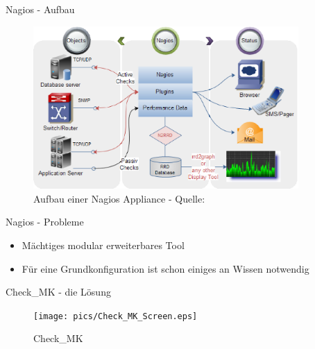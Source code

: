 \documentclass[12pt]{beamer}              %
\begin{document}
\begin{frame}{Nagios - Aufbau}
	\begin{figure}
		\centering
		\includegraphics[width=0.9\textwidth]{pics/NagiosMonitoring.eps}
		\caption[Grober Aufbau von Nagios]{Aufbau einer Nagios Appliance - Quelle: \textcite{nagiosaufbau}}
	\end{figure}
\end{frame}
\begin{frame}{Nagios - Probleme}
	\begin{itemize}
		\item Mächtiges modular erweiterbares Tool
		\item Für eine Grundkonfiguration ist schon einiges an Wissen notwendig
	\end{itemize}
\end{frame}
\begin{frame}{Check\_MK - die Lösung}
	\begin{figure}
		\centering
		\texttt{[image: pics/Check\_MK\_Screen.eps]}
		\caption[Check\_MK]{Check\_MK}
	\end{figure}
\end{frame}
\end{document}
